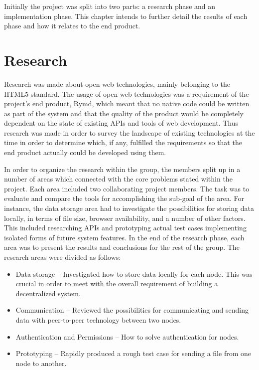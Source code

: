 Initially the project was split into two parts: a research phase and an implementation phase. This chapter intends to further detail the results of each phase and how it relates to the end product.

\section{Research}

Research was made about open web technologies, mainly belonging to the HTML5 standard. The usage of open web technologies was a requirement of the project's end product, Rymd, which meant that no native code could be written as part of the system and that the quality of the product would be completely dependent on the state of existing APIs and tools of web development. Thus research was made in order to survey the landscape of existing technologies at the time in order to determine which, if any, fulfilled the requirements so that the end product actually could be developed using them.

In order to organize the research within the group, the members split up in a number of areas which connected with the core problems stated within the project. Each area included two collaborating project members. The task was to evaluate and compare the tools for accomplishing the sub-goal of the area. For instance, the data storage area had to investigate the possibilities for storing data locally, in terms of file size, browser availability, and a number of other factors. This included researching APIs and prototyping actual test cases implementing isolated forms of future system features. In the end of the research phase, each area was to present the results and conclusions for the rest of the group. The research areas were divided as follows:

\begin{itemize}
\item Data storage – Investigated how to store data locally for each node. This was crucial in order to meet with the overall requirement of building a decentralized system.
\item Communication – Reviewed the possibilities for communicating and sending data with peer-to-peer technology between two nodes.
\item Authentication and Permissions – How to solve authentication for nodes.
\item Prototyping – Rapidly produced a rough test case for sending a file from one node to another.
\end{itemize}

